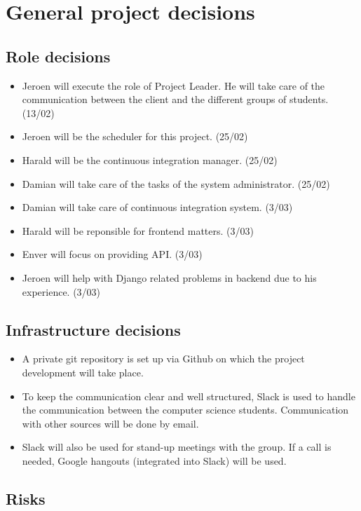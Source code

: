 \chapter{General project decisions}

\section{Role decisions}

\begin{itemize}
 \item Jeroen will execute the role of Project Leader. He will take care of the communication between the client and the different groups of students. (13/02)
 \item Jeroen will be the scheduler for this project. (25/02)
 \item Harald will be the continuous integration manager. (25/02)
 \item Damian will take care of the tasks of the system administrator. (25/02)
 \item Damian will take care of continuous integration system. (3/03)
 \item Harald will be reponsible for frontend matters. (3/03)
 \item Enver will focus on providing API. (3/03)
 \item Jeroen will help with Django related problems in backend due to his experience. (3/03)
\end{itemize}

\section{Infrastructure decisions}
\begin{itemize}
	\item A private git repository is set up via Github on which the project development will take place.
    \item To keep the communication clear and well structured, Slack is used to handle the communication between the computer science students. Communication with other sources will be done by email.
    \item Slack will also be used for stand-up meetings with the group. If a call is needed, Google hangouts (integrated into Slack) will be used.
\end{itemize}

\section{Risks}

